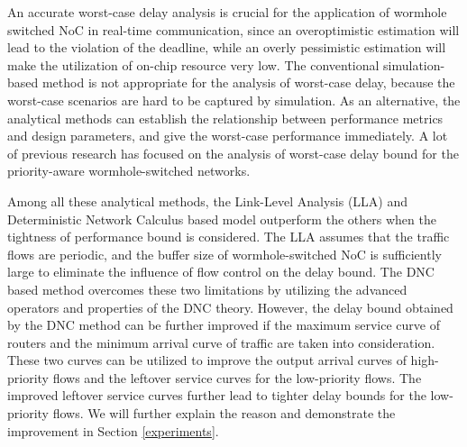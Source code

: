 \documentclass[preprint]{elsarticle}
\begin{document}
An accurate worst-case delay analysis is crucial for the application of wormhole switched NoC in real-time communication, since an overoptimistic estimation will lead to the violation of the deadline, while an overly pessimistic estimation will make the utilization of on-chip resource very low. The conventional simulation-based method is not appropriate for the analysis of worst-case delay, because the worst-case scenarios are hard to be captured by simulation. As an alternative, the analytical methods can establish the relationship between performance metrics and design parameters, and give the worst-case performance immediately. A lot of previous research \cite{Shi:2008:RCA:1397757.1397996,73,Qian489900,LuJS05,707545,708526,LuJS05} has focused on the analysis of worst-case delay bound for the priority-aware wormhole-switched networks.

Among all these analytical methods, the Link-Level Analysis (LLA) \cite{73} and Deterministic Network Calculus \cite{Qian489900} based model outperform the others when the tightness of performance bound is considered. The LLA assumes that the traffic flows are periodic, and the buffer size of wormhole-switched NoC is sufficiently large to eliminate the influence of flow control on the delay bound. The DNC based method \cite{Qian489900} overcomes these two limitations by utilizing the advanced operators and properties of the DNC theory. However, the delay bound obtained by the DNC method \cite{Qian489900} can be further improved if the maximum service curve of routers and the minimum arrival curve of traffic are taken into consideration. These two curves can be utilized to improve the output arrival curves of high-priority flows and the leftover service curves for the low-priority flows. The improved leftover service curves further lead to tighter delay bounds for the low-priority flows. We will further explain the reason and demonstrate the improvement in Section \ref{experiments}.
\end{document}
